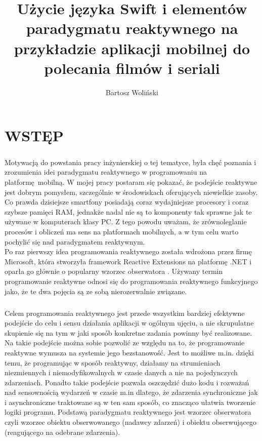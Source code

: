\documentclass[12pt,oneside,a4paper]{report}
\title{Użycie języka Swift i elementów paradygmatu reaktywnego na przykładzie aplikacji mobilnej do polecania filmów i seriali}
\author{Bartosz Woliński}
\begin{document}
\maketitle
\tableofcontents
\chapter{WSTĘP}

\paragraph{}Motywacją do powstania pracy inżynierskiej o tej tematyce, była chęć poznania i zrozumienia idei paradygmatu reaktywnego w programowaniu na platformę mobilną. W mojej pracy postaram się pokazać, że podejście reaktywne jest dobrym pomysłem,  szczególnie w środowiskach oferujących niewielkie zasoby. Co prawda dzisiejsze smartfony posiadają coraz wydajniejsze procesory i coraz szybsze pamięci RAM, jednakże nadal nie są to komponenty tak sprawne jak te używane w komputerach klasy PC. Z tego powodu uważam, że zrównoleglanie procesów i obliczeń ma sens na platformach mobilnych, a w tym celu warto pochylić się nad paradygmatem reaktywnym.\\ Po raz pierwszy idea programowania reaktywnego została wdrożona przez firmę Microsoft, która stworzyła framework Reactive Extensions na platformę .NET i oparła go głównie o popularny wzorzec obserwatora \cite{MicrosoftRx}. 
Używany termin programowanie reaktywne odnosi się do programowania reaktywnego funkcyjnego jako, że te dwa pojęcia są ze sobą nierozerwalnie związane.
\paragraph{}Celem programowania reaktywnego jest przede wszystkim bardziej efektywne podejście do celu i sensu działania aplikacji w ogólnym ujęciu, a nie skrupulatne skupienie się na tym w jaki sposób konkretne zadania powinny być realizowane. Na takie podejście można sobie pozwolić ze względu na to, że programowanie reaktywne wymusza na systemie jego bezstanowość. Jest to możliwe m.in. dzięki temu, że programując w sposób reaktywny, działamy na strumieniach niezmiennych i niemodyfikowalnych w czasie danych a nie na pojedynczych zdarzeniach. Ponadto takie podejście pozwala oszczędzić dużo kodu i rozważań nad sensownością wydarzeń w czasie m.in dlatego, że zdarzenia synchroniczne jak i asynchroniczne traktowane są w ten sam sposób, co znacząco ułatwia tworzenie logiki programu. Podstawą paradygmatu reaktywnego jest wzorzec obserwatora czyli wzorzec obiektu obserwowanego (nadawcy zdarzeń) i obiektu obserwującego (reagującego na odebrane zdarzenia).
\end{document}
